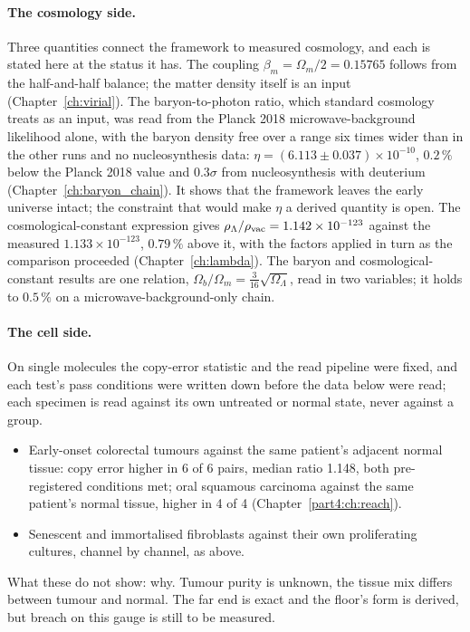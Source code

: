\paragraph{The cosmology side.} Three quantities connect the framework to measured cosmology, and each is stated here at the status it
has. The coupling $\beta_m=\Omega_m/2=0.15765$ follows from the half-and-half balance; the matter density itself is an input
(Chapter~\ref{ch:virial}). \derived{} The baryon-to-photon ratio, which standard cosmology treats as an input, was read from the Planck 2018
microwave-background likelihood alone, with the baryon density free over a range six times wider than in the other runs and no nucleosynthesis data:
$\eta=(6.113\pm0.037)\times10^{-10}$, $0.2\,\%$ below the Planck 2018 value and $0.3\sigma$ from nucleosynthesis with deuterium
(Chapter~\ref{ch:baryon_chain}). \measured{} It shows that the framework leaves the early universe intact; the constraint that would make
$\eta$ a derived quantity is open. \openprob{} The cosmological-constant expression gives $\rho_\Lambda/\rho_{\rm vac}=1.142\times10^{-123}$
against the measured $1.133\times10^{-123}$, $0.79\,\%$ above it, with the factors applied in turn as the comparison proceeded
(Chapter~\ref{ch:lambda}). \fitted{} The baryon and cosmological-constant results are one relation, $\Omega_b/\Omega_m=\tfrac3{16}
\sqrt{\Omega_\Lambda}$, read in two variables; it holds to $0.5\,\%$ on a microwave-background-only chain. \observed

\paragraph{The cell side.} On single molecules the copy-error statistic and the read pipeline were fixed, and each test's pass conditions
were written down before the data below were read; each specimen is read against its own untreated or normal state, never against
a group.
\begin{itemize}
\item Early-onset colorectal tumours against the same patient's adjacent normal tissue: copy error higher in 6 of 6 pairs, median ratio
      1.148, both pre-registered conditions met; oral squamous carcinoma against the same patient's normal tissue, higher in 4 of 4
      (Chapter~\ref{part4:ch:reach}). \measured
\item Senescent and immortalised fibroblasts against their own proliferating cultures, channel by channel, as above. \measured
\end{itemize}
What these do not show: why. Tumour purity is unknown, the tissue mix differs between tumour and normal. The far end is exact and the floor's form is derived, but breach on this gauge is still to be
measured. \openprob

